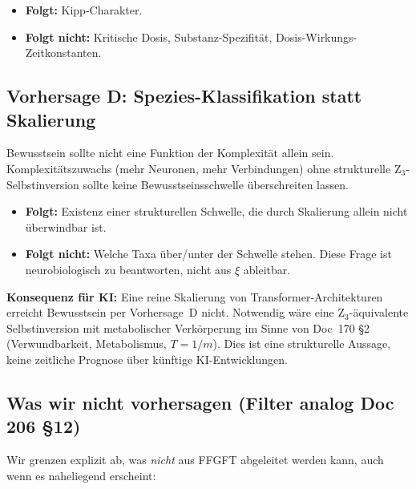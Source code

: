\begin{itemize}
\item \textbf{Folgt:} Kipp-Charakter.
\item \textbf{Folgt nicht:} Kritische Dosis, Substanz-Spezifität, Dosis-Wirkungs-Zeitkonstanten.
\end{itemize}

\subsection{Vorhersage D: Spezies-Klassifikation statt Skalierung}\label{sec:vorhersageD}

Bewusstsein sollte nicht eine Funktion der Komplexität allein sein. Komplexitätszuwachs (mehr Neuronen, mehr Verbindungen) ohne strukturelle Z$_3$-Selbstinversion sollte keine Bewusstseinsschwelle überschreiten lassen.

\begin{itemize}
\item \textbf{Folgt:} Existenz einer strukturellen Schwelle, die durch Skalierung allein nicht überwindbar ist.
\item \textbf{Folgt nicht:} Welche Taxa über/unter der Schwelle stehen. Diese Frage ist neurobiologisch zu beantworten, nicht aus $\xi$ ableitbar.
\end{itemize}

\textbf{Konsequenz für KI:} Eine reine Skalierung von Transformer-Architekturen erreicht Bewusstsein per Vorhersage~D nicht. Notwendig wäre eine Z$_3$-äquivalente Selbstinversion mit metabolischer Verkörperung im Sinne von Doc~170 \S2 (Verwundbarkeit, Metabolismus, $T = 1/m$). Dies ist eine strukturelle Aussage, keine zeitliche Prognose über künftige KI-Entwicklungen.

\subsection{Was wir nicht vorhersagen (Filter analog Doc 206 \S12)}\label{sec:vorhersagen_filter}

Wir grenzen explizit ab, was \emph{nicht} aus FFGFT abgeleitet werden kann, auch wenn es naheliegend erscheint:

